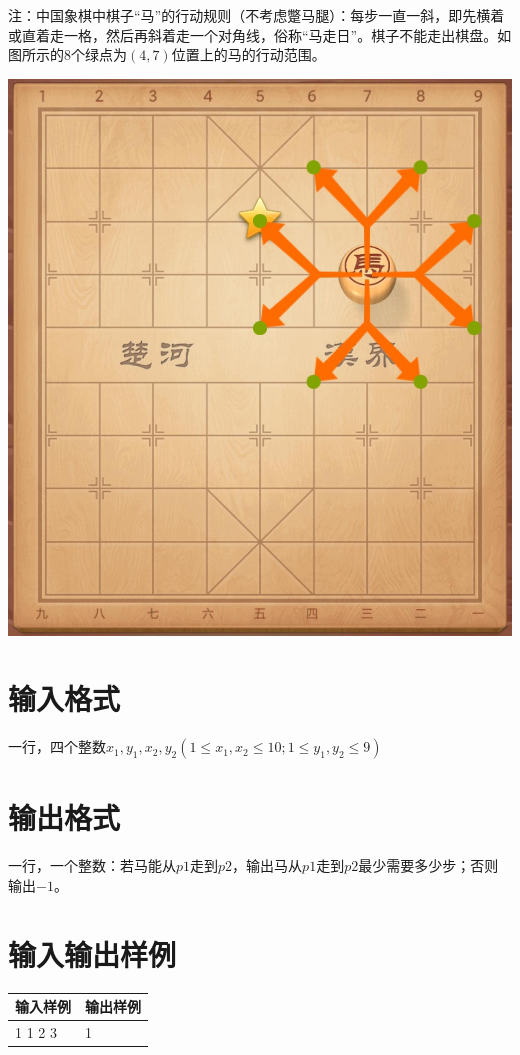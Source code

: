 \documentclass[
	lang=cn,
	color=green
]{elegantbook}
\begin{document}
注：中国象棋中棋子“马”的行动规则（不考虑蹩马腿）：每步一直一斜，即先横着或直着走一格，然后再斜着走一个对角线，俗称“马走日”。棋子不能走出棋盘。如图所示的$8$个绿点为$(4,7)$位置上的马的行动范围。

\begin{center}
	\includegraphics[scale=0.1]{images/chess.jpg}
\end{center}

\section*{输入格式}
一行，四个整数$x_1,y_1,x_2,y_2(1 \leq x_1,x_2 \leq 10; 1 \leq y_1,y_2 \leq 9)$

\section*{输出格式}
一行，一个整数：若马能从$p1$走到$p2$，输出马从$p1$走到$p2$最少需要多少步；否则输出$-1$。

\section*{输入输出样例}
\begin{tabularx}{450pt}{X|X}
	\toprule
	输入样例 & 输出样例 \\
	\midrule
	1 1 2 3  & 1        \\
	\bottomrule
\end{tabularx}
\vspace{0.5cm}
\end{document}

